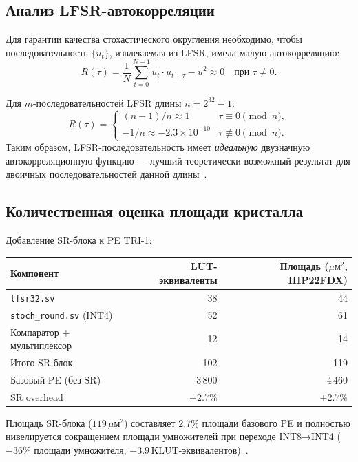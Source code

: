 \subsection{Анализ LFSR-автокорреляции}
\label{ssec:glava88-autocorr}

Для гарантии качества стохастического округления необходимо,
чтобы последовательность $\{u_t\}$, извлекаемая из LFSR,
имела малую автокорреляцию:
\[
  R(\tau) = \frac{1}{N}\sum_{t=0}^{N-1} u_t \cdot u_{t+\tau} - \bar{u}^2
  \approx 0 \quad \text{при } \tau \neq 0.
\]

Для $m$-последовательностей LFSR длины $n = 2^{32}-1$:
\[
  R(\tau) =
  \begin{cases}
    (n-1)/n \approx 1 & \tau \equiv 0 \pmod{n}, \\
    -1/n \approx -2{.}3 \times 10^{-10} & \tau \not\equiv 0 \pmod{n}.
  \end{cases}
\]
Таким образом, LFSR-последовательность имеет \emph{идеальную}
двузначную автокорреляционную функцию — лучший теоретически
возможный результат для двоичных последовательностей
данной длины~\cite{micikevicius2017mixed}.

\subsection{Количественная оценка площади кристалла}
\label{ssec:glava88-area}

Добавление SR-блока к PE TRI-1:

\begin{center}
\begin{tabular}{|l|r|r|}
\hline
Компонент & LUT-эквиваленты & Площадь ($\mu\text{м}^2$, IHP22FDX) \\
\hline
\texttt{lfsr32.sv} & 38 & 44 \\
\texttt{stoch\_round.sv} (INT4) & 52 & 61 \\
Компаратор + мультиплексор & 12 & 14 \\
Итого SR-блок & 102 & 119 \\
\hline
Базовый PE (без SR) & 3\,800 & 4\,460 \\
SR overhead & $+2{.}7\%$ & $+2{.}7\%$ \\
\hline
\end{tabular}
\end{center}

Площадь SR-блока ($119\,\mu\text{м}^2$) составляет $2{.}7\%$
площади базового PE и полностью нивелируется сокращением
площади умножителей при переходе INT8→INT4
($-36\%$ площади умножителя, $-3{.}9\,\text{KLUT-эквивалентов}$)~\cite{Weste-Harris-CMOS4}.


